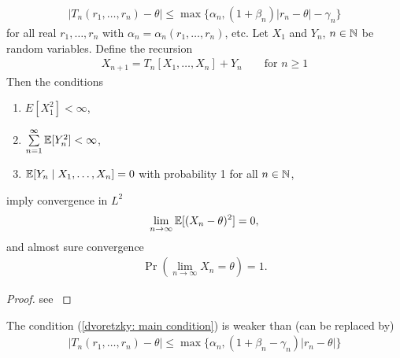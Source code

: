 \begin{thm}
\begin{align}
        |T_n(r_1,\dots,r_n)-\theta| \le \max\{\alpha_n, (1+\beta_n)|r_n -\theta| -\gamma_n\} \label{dvoretzky: main condition}
    \end{align}
    for all real \(r_1,\dots,r_n\) with \(\alpha_n=\alpha_n(r_1,\dots,r_n)\), etc. Let \(X_1\) and \(Y_n\), \(n\in\mathbb{N}\) be random variables. Define the recursion
    \begin{align}
        X_{n+1}=T_n[X_1,\dots,X_n] +Y_n \qquad \text{for }n\ge 1
    \end{align}
    Then the conditions
    \begin{enumerate}
        \item \(E[X_1^2]<\infty\),
        \item \(\sum\limits_{n=1}^\infty \mathbb{E}[Y_n^2]<\infty\),
        \item \(\mathbb{E}[Y_n\mid X_1,\dots,X_n]=0\) with probability 1 for all \(n\in\mathbb{N}\),
    \end{enumerate}
    imply convergence in \(L^2\)
    \begin{align}
        \lim_{n\to\infty} \mathbb{E}[(X_n-\theta)^2]=0,
    \end{align}
    and almost sure convergence
    \begin{align}
        \Pr(\lim_{n\to\infty} X_n=\theta)=1.
    \end{align}
\end{thm}
\begin{proof}
    see \textcite{dvoretzkyStochasticApproximation1956} 
\end{proof}
\begin{remark}
    The condition (\ref{dvoretzky: main condition}) is weaker than (can be replaced by)
    \begin{align}\label{dvoretzky: alt main cond}
        |T_n(r_1,\dots,r_n)-\theta|\le \max \{\alpha_n, (1+\beta_n -\gamma_n)|r_n-\theta|\}
    \end{align}
\end{remark}
